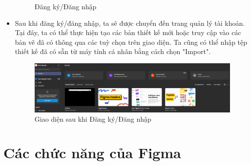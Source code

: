 \documentclass[11pt]{article}
\begin{document}
\begin{itemize}
\begin{figure}[!h]
              \caption{Đăng ký/Đăng nhập}
          \end{figure}
          \newpage
    \item Sau khi đăng ký/đăng nhập, ta sẽ được chuyển đến trang quản lý tài khoản. Tại đây, ta có thể thực hiện tạo các bản thiết kế mới hoặc truy cập vào các bản vẽ đã có thông qua các tuỳ chọn trên giao diện. Ta cũng có thể nhập tệp thiết kế đã có sẵn từ máy tính cá nhân bằng cách chọn "Import".

          \begin{figure}[!h]
              \centering
              \includegraphics[width=1\linewidth]{imgs/image copy 2.png}
              \caption{Giao diện sau khi Đăng ký/Đăng nhập}
          \end{figure}
\end{itemize}

\section{Các chức năng của Figma}
\end{document}
